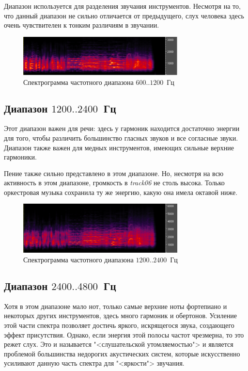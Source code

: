 \documentclass[oneside, final, 14pt]{extreport}
\begin{document}
 Диапазон используется для разделения звучания инструментов. Несмотря на то, что данный диапазон не сильно отличается от предыдущего, слух человека здесь очень чувствителен к тонким различиям в звучании.

\begin{figure}[h]
  \centering
  \includegraphics[width=0.75\textwidth]{pic-specter-04}
  \caption{Спектрограмма частотного диапазона $600..1200$~Гц}
  \label{pic-specter-04}
\end{figure}

\subsection{Диапазон $1200..2400$~Гц}
Этот диапазон важен для речи: здесь у гармоник находится достаточно энергии для того, чтобы различить большинство гласных звуков и все согласные звуки. Диапазон также важен для медных инструментов, имеющих сильные верхние гармоники.

Пение также сильно представлено в этом диапазоне. Но, несмотря на всю активность в этом диапазоне, громкость в \emph{track06} не столь высока. Только оркестровая музыка сохранила ту же энергию, какую она имела октавой ниже.

\begin{figure}[h]
  \centering
  \includegraphics[width=0.75\textwidth]{pic-specter-05}
  \caption{Спектрограмма частотного диапазона $1200..2400$~Гц}
  \label{pic-specter-05}
\end{figure}

\subsection{Диапазон $2400..4800$~Гц}
Хотя в этом диапазоне мало нот, только самые верхние ноты фортепиано и некоторых других инструментов, здесь много гармоник и обертонов. Усиление этой части спектра позволяет достичь яркого, искрящегося звука, создающего эффект присутствия. Однако, если энергия этой полосы частот чрезмерна, то это режет слух. Это и называется "<слушательской утомляемостью"> и является проблемой большинства недорогих акустических систем, которые искусственно усиливают данную часть спектра для "<яркости"> звучания.
\end{document}
